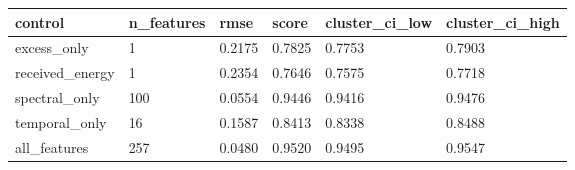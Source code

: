 \begin{tabular}{llllll}
\toprule
control & n\_features & rmse & score & cluster\_ci\_low & cluster\_ci\_high \\
\midrule
excess\_only & 1 & 0.2175 & 0.7825 & 0.7753 & 0.7903 \\
received\_energy & 1 & 0.2354 & 0.7646 & 0.7575 & 0.7718 \\
spectral\_only & 100 & 0.0554 & 0.9446 & 0.9416 & 0.9476 \\
temporal\_only & 16 & 0.1587 & 0.8413 & 0.8338 & 0.8488 \\
all\_features & 257 & 0.0480 & 0.9520 & 0.9495 & 0.9547 \\
\bottomrule
\end{tabular}
